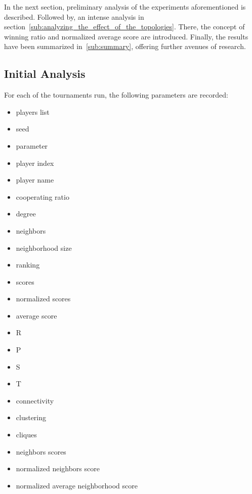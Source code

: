

In the next section, preliminary analysis of the experiments aforementioned
is described. Followed by, an intense analysis in section~\ref{sub:analyzing_the_effect_of_the_topologies}.
There, the concept of winning ratio and normalized average score are introduced.
Finally, the results have been summarized in~\ref{sub:summary}, offering further
avenues of research.


\subsection{Initial Analysis}
\label{sub:initial_analysis}
For each of the tournaments run, the following parameters are recorded:

\begin{multicols}{3}
  \begin{itemize}
    \item players list
    \item seed
    \item parameter
    \item player index
    \item player name
    \item cooperating ratio
    \item degree
    \item neighbors
    \item neighborhood size
    \item ranking
    \item scores
    \item normalized scores
    \item average score
    \item R
    \item P
    \item S
    \item T
    \item connectivity
    \item clustering
    \item cliques
    \item neighbors scores
    \item normalized neighbors score
    \item normalized average neighborhood score
  \end{itemize}
\end{multicols}

